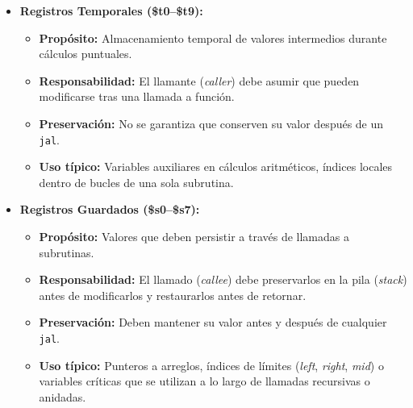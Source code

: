 \documentclass[12pt,a4paper]{article}
\begin{document}
	\begin{itemize}
		\item \textbf{Registros Temporales (\$t0--\$t9):}
		\begin{itemize}
			\item \textbf{Propósito:} Almacenamiento temporal de valores intermedios durante cálculos puntuales.
			\item \textbf{Responsabilidad:} El llamante (\textit{caller}) debe asumir que pueden modificarse tras una llamada a función.
			\item \textbf{Preservación:} No se garantiza que conserven su valor después de un \texttt{jal}.
			\item \textbf{Uso típico:} Variables auxiliares en cálculos aritméticos, índices locales dentro de bucles de una sola subrutina.
		\end{itemize}
		\item \textbf{Registros Guardados (\$s0--\$s7):}
		\begin{itemize}
			\item \textbf{Propósito:} Valores que deben persistir a través de llamadas a subrutinas.
			\item \textbf{Responsabilidad:} El llamado (\textit{callee}) debe preservarlos en la pila (\textit{stack}) antes de modificarlos y restaurarlos antes de retornar.
			\item \textbf{Preservación:} Deben mantener su valor antes y después de cualquier \texttt{jal}.
			\item \textbf{Uso típico:} Punteros a arreglos, índices de límites (\textit{left}, \textit{right}, \textit{mid}) o variables críticas que se utilizan a lo largo de llamadas recursivas o anidadas.
		\end{itemize}
	\end{itemize}
	
\end{document}
